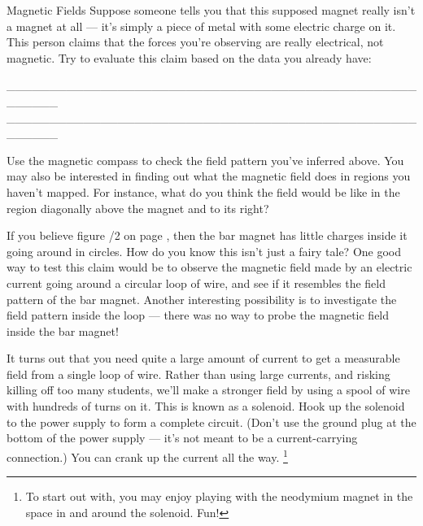 \begin{lab}{Magnetic Fields}
Suppose someone tells you that this supposed magnet really isn't a magnet at all --- it's
simply a piece of metal with some electric charge on it. This person claims that the
forces you're observing are really electrical, not magnetic. Try to evaluate this claim
based on the data you already have:

\newcommand{\fieldslabonelineforwriting}{\_\_\_\_\_\_\_\_\_\_\_\_\_\_\_\_\_\_\_\_\_\_\_\_\_\_\_\_\_\_\_\_\_\_\_\_\_\_\_\_\_\_\_\_\_\_\_\_\_\_\_\_\_\_}
\newcommand{\fieldslabspaceforwriting}{\fieldslabonelineforwriting\\ \fieldslabonelineforwriting}
\fieldslabspaceforwriting


Use the magnetic compass to check the field pattern you've inferred above. You may also be
interested in finding out what the magnetic field does in regions you haven't mapped.
For instance, what do you think the field would be like in the region diagonally
above the magnet and to its right?


If you believe figure /2 on page \pageref{fig:barmagnethanging}, then
the bar magnet has little charges inside it going around in circles. How do you know this isn't
just a fairy tale? One good way to test this claim would be to observe the magnetic field made
by an electric current going around a circular loop of wire, and see if it resembles the field
pattern of the bar magnet. Another interesting possibility is to investigate the field pattern
inside the loop --- there was no way to probe the magnetic field inside the bar magnet!


It turns out that you need quite a large amount of current to get a measurable field from a single
loop of wire. Rather than using large currents, and risking killing off too many students,
we'll make a stronger field by using a spool of wire with hundreds of turns on it. This is known
as a solenoid. Hook up the solenoid to
the power supply to form a complete circuit. (Don't use the ground plug at the bottom of the
power supply --- it's not meant to be a current-carrying connection.) You can crank up the
current all the way.
\footnote{To start out with, you may enjoy playing with the neodymium magnet in the space in and around
the solenoid. Fun!}


\end{lab}
